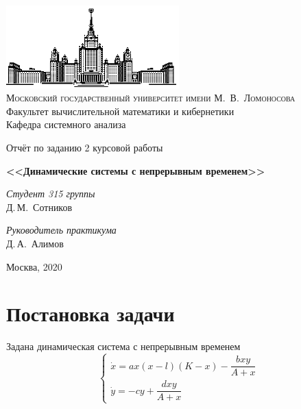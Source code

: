 \documentclass[16pt]{article}
\begin{document}
\thispagestyle{empty}

\begin{center}
\ \vspace{-3cm}

\includegraphics[width=0.5\textwidth]{msu.eps}\\
{\scshape Московский государственный университет имени М.~В.~Ломоносова}\\
Факультет вычислительной математики и кибернетики\\
Кафедра системного анализа

\vfill

{\LARGE Отчёт по заданию 2 курсовой работы}

\vspace{1cm}

{\Huge\bfseries <<Динамические системы с непрерывным временем>>}
\end{center}

\vspace{1cm}

\begin{flushright}
  \large
  \textit{Студент 315 группы}\\
  Д.\,М.~Сотников

  \vspace{5mm}

  \textit{Руководитель практикума}\\
  Д.\,А.~Алимов
\end{flushright}

\vfill

\begin{center}
Москва, 2020
\end{center}

\newpage

\section{Постановка задачи}
Задана динамическая система с непрерывным временем
$$
\begin{cases}
\dot x = ax(x-l)(K-x) - \dfrac{bxy}{A+x} \\
\dot y = -cy + \dfrac{dxy}{A + x}
\end{cases}
$$
\end{document}

